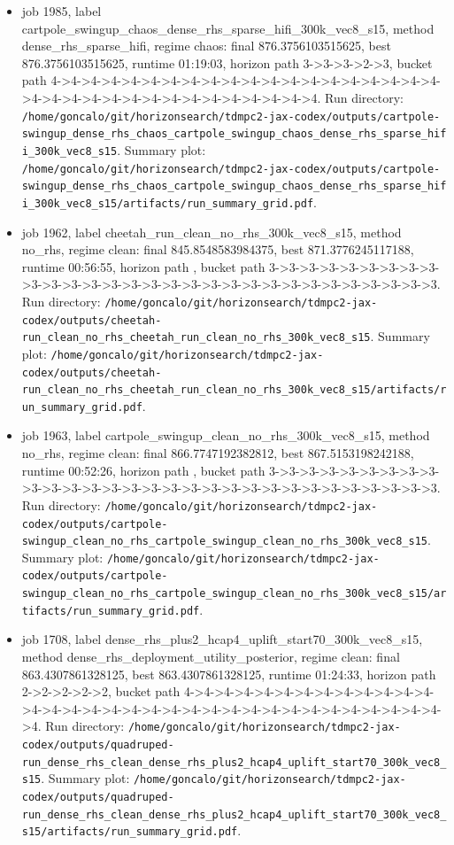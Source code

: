 \begin{itemize}
\item job 1985, label cartpole\_swingup\_chaos\_dense\_rhs\_sparse\_hifi\_300k\_vec8\_s15, method dense\_rhs\_sparse\_hifi, regime chaos: final 876.3756103515625, best 876.3756103515625, runtime 01:19:03, horizon path 3->3->3->2->3, bucket path 4->4->4->4->4->4->4->4->4->4->4->4->4->4->4->4->4->4->4->4->4->4->4->4->4->4->4->4->4->4->4->4->4->4->4. Run directory: \texttt{/home/goncalo/git/horizonsearch/tdmpc2-jax-codex/outputs/cartpole-swingup\_dense\_rhs\_chaos\_cartpole\_swingup\_chaos\_dense\_rhs\_sparse\_hifi\_300k\_vec8\_s15}. Summary plot: \texttt{/home/goncalo/git/horizonsearch/tdmpc2-jax-codex/outputs/cartpole-swingup\_dense\_rhs\_chaos\_cartpole\_swingup\_chaos\_dense\_rhs\_sparse\_hifi\_300k\_vec8\_s15/artifacts/run\_summary\_grid.pdf}.
\item job 1962, label cheetah\_run\_clean\_no\_rhs\_300k\_vec8\_s15, method no\_rhs, regime clean: final 845.8548583984375, best 871.3776245117188, runtime 00:56:55, horizon path , bucket path 3->3->3->3->3->3->3->3->3->3->3->3->3->3->3->3->3->3->3->3->3->3->3->3->3->3->3->3->3->3. Run directory: \texttt{/home/goncalo/git/horizonsearch/tdmpc2-jax-codex/outputs/cheetah-run\_clean\_no\_rhs\_cheetah\_run\_clean\_no\_rhs\_300k\_vec8\_s15}. Summary plot: \texttt{/home/goncalo/git/horizonsearch/tdmpc2-jax-codex/outputs/cheetah-run\_clean\_no\_rhs\_cheetah\_run\_clean\_no\_rhs\_300k\_vec8\_s15/artifacts/run\_summary\_grid.pdf}.
\item job 1963, label cartpole\_swingup\_clean\_no\_rhs\_300k\_vec8\_s15, method no\_rhs, regime clean: final 866.7747192382812, best 867.5153198242188, runtime 00:52:26, horizon path , bucket path 3->3->3->3->3->3->3->3->3->3->3->3->3->3->3->3->3->3->3->3->3->3->3->3->3->3->3->3->3->3. Run directory: \texttt{/home/goncalo/git/horizonsearch/tdmpc2-jax-codex/outputs/cartpole-swingup\_clean\_no\_rhs\_cartpole\_swingup\_clean\_no\_rhs\_300k\_vec8\_s15}. Summary plot: \texttt{/home/goncalo/git/horizonsearch/tdmpc2-jax-codex/outputs/cartpole-swingup\_clean\_no\_rhs\_cartpole\_swingup\_clean\_no\_rhs\_300k\_vec8\_s15/artifacts/run\_summary\_grid.pdf}.
\item job 1708, label dense\_rhs\_plus2\_hcap4\_uplift\_start70\_300k\_vec8\_s15, method dense\_rhs\_deployment\_utility\_posterior, regime clean: final 863.4307861328125, best 863.4307861328125, runtime 01:24:33, horizon path 2->2->2->2->2, bucket path 4->4->4->4->4->4->4->4->4->4->4->4->4->4->4->4->4->4->4->4->4->4->4->4->4->4->4->4->4->4->4->4->4->4->4. Run directory: \texttt{/home/goncalo/git/horizonsearch/tdmpc2-jax-codex/outputs/quadruped-run\_dense\_rhs\_clean\_dense\_rhs\_plus2\_hcap4\_uplift\_start70\_300k\_vec8\_s15}. Summary plot: \texttt{/home/goncalo/git/horizonsearch/tdmpc2-jax-codex/outputs/quadruped-run\_dense\_rhs\_clean\_dense\_rhs\_plus2\_hcap4\_uplift\_start70\_300k\_vec8\_s15/artifacts/run\_summary\_grid.pdf}.

\end{itemize}
